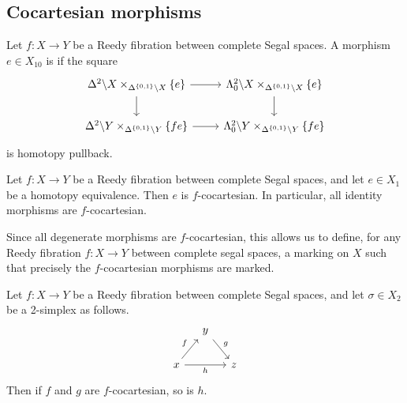 \documentclass[main.tex]{subfiles}
\begin{document}
\subsection{Cocartesian morphisms}
\label{ssc:cocartesian_morphisms}

\begin{definition}
  Let $f\colon X \to Y$ be a Reedy fibration between complete Segal spaces. A morphism $e \in X_{10}$ is  if the square
  \begin{equation*}
    \begin{tikzcd}
      \Delta^{2} \backslash X \times_{\Delta^{\{0, 1\}} \backslash X} \{e\}
      \arrow[r]
      \arrow[d]
      & \Lambda^{2}_{0} \backslash X \times_{\Delta^{\{0, 1\}} \backslash X} \{e\}
      \arrow[d]
      \\
      \Delta^{2} \backslash Y \times_{\Delta^{\{0, 1\}} \backslash Y} \{fe\}
      \arrow[r]
      & \Lambda^{2}_{0} \backslash Y \times_{\Delta^{\{0, 1\}} \backslash Y} \{fe\}
    \end{tikzcd}
  \end{equation*}
  is homotopy pullback.
\end{definition}

\begin{lemma}
  Let $f\colon X \to Y$ be a Reedy fibration between complete Segal spaces, and let $e \in X_{1}$ be a homotopy equivalence. Then $e$ is $f$-cocartesian. In particular, all identity morphisms are $f$-cocartesian.
\end{lemma}

Since all degenerate morphisms are $f$-cocartesian, this allows us to define, for any Reedy fibration $f\colon X \to Y$ between complete segal spaces, a marking on $X$ such that precisely the $f$-cocartesian morphisms are marked.

\begin{lemma}
  \label{lemma:cocartesian_closed_under_composition}
  Let $f\colon X \to Y$ be a Reedy fibration between complete Segal spaces, and let $\sigma \in X_{2}$ be a 2-simplex as follows.
  \begin{equation*}
    \begin{tikzcd}[column sep=small]
      & y
      \arrow[dr, "g"]
      \\
      x
      \arrow[ur, "f"]
      \arrow[rr, swap, "h"]
      && z
    \end{tikzcd}
  \end{equation*}
  Then if $f$ and $g$ are $f$-cocartesian, so is $h$.
\end{lemma}
\end{document}
